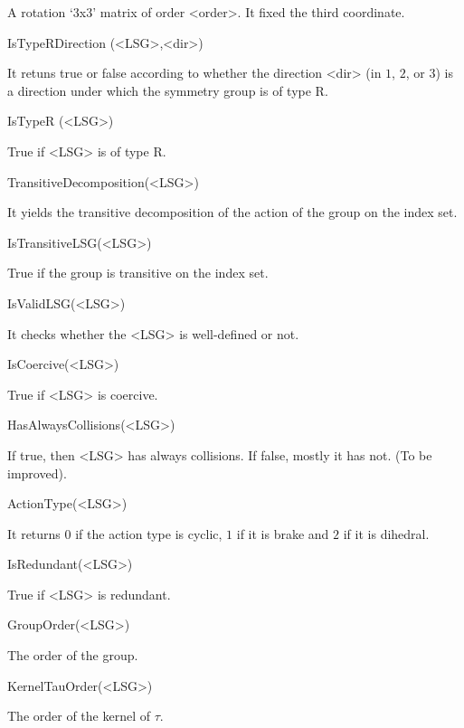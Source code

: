 A rotation `3x3' matrix of order <order>. It fixed the third
coordinate.

\> IsTypeRDirection (<LSG>,<dir>)

It retuns true or false according to whether the direction
<dir> (in $1$, $2$, or $3$) is a direction under which 
the symmetry group is of type R.

\> IsTypeR (<LSG>)

True if <LSG> is of type R.

\> TransitiveDecomposition(<LSG>)

It yields the transitive decomposition of the action of the group
on the index set.

\> IsTransitiveLSG(<LSG>)

True if the group is transitive on the index set.

\> IsValidLSG(<LSG>)

It checks whether the <LSG> is well-defined or not.

\> IsCoercive(<LSG>)

True if <LSG> is coercive.

\> HasAlwaysCollisions(<LSG>)

If true, then  <LSG> has always collisions.  If false, mostly
it has not. (To be improved).


\> ActionType(<LSG>)

It returns $0$ if the action type is cyclic, $1$ if it is brake
and $2$ if it is dihedral.

\> IsRedundant(<LSG>)

True if <LSG> is redundant.

\> GroupOrder(<LSG>)

The order of the group.

\> KernelTauOrder(<LSG>)

The order of the kernel of $\tau$.


